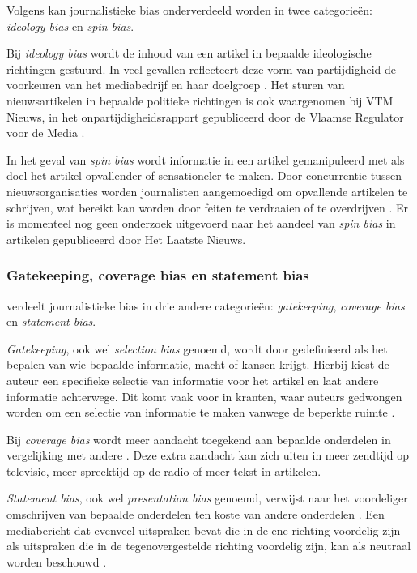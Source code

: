 Volgens \textcite{Mullainathan2002} kan journalistieke bias onderverdeeld worden in twee categorieën: \textit{ideology bias} en \textit{spin bias}. 

Bij \textit{ideology bias} wordt de inhoud van een artikel in bepaalde ideologische richtingen gestuurd. In veel gevallen reflecteert deze vorm van partijdigheid de voorkeuren van het mediabedrijf en haar doelgroep \autocite{Mullainathan2002}. Het sturen van nieuwsartikelen in bepaalde politieke richtingen is ook waargenomen bij VTM Nieuws, in het onpartijdigheidsrapport gepubliceerd door de Vlaamse Regulator voor de Media \autocite{VanAelst2024}.

In het geval van \textit{spin bias} wordt informatie in een artikel gemanipuleerd met als doel het artikel opvallender of sensationeler te maken. Door concurrentie tussen nieuwsorganisaties worden journalisten aangemoedigd om opvallende artikelen te schrijven, wat bereikt kan worden door feiten te verdraaien of te overdrijven \autocite{Alsem2008}. Er is momenteel nog geen onderzoek uitgevoerd naar het aandeel van \textit{spin bias} in artikelen gepubliceerd door Het Laatste Nieuws.

\subsubsection{Gatekeeping, coverage bias en state\-ment bias}

\textcite{SaezTrumper2013} verdeelt journalistie\-ke bias in drie andere categorieën: \textit{gatekeeping}, \textit{coverage bias} en \textit{statement bias}.

\textit{Gatekeeping}, ook wel \textit{selection bias} genoemd, wordt door \textcite{CALD2025} gedefinieerd als het bepalen van wie bepaalde informatie, macht of kansen krijgt. Hierbij kiest de auteur een specifieke selectie van informatie voor het artikel en laat andere informatie achterwege. Dit komt vaak voor in kranten, waar auteurs gedwongen worden om een selectie van informatie te maken vanwege de beperkte ruimte \autocite{SaezTrumper2013}.

Bij \textit{coverage bias} wordt meer aandacht toegekend aan bepaalde onderdelen in vergelijking met andere \autocite{DAlessio2006}. Deze extra aandacht kan zich uiten in meer zendtijd op televisie, meer spreektijd op de radio of meer tekst in artikelen.

\textit{Statement bias}, ook wel \textit{presentation bias} genoemd, verwijst naar het voordeliger omschrijven van bepaalde onderdelen ten koste van andere onderdelen \autocite{SaezTrumper2013}. Een mediabericht dat evenveel uitspraken bevat die in de ene richting voordelig zijn als uitspraken die in de tegenovergestelde richting voordelig zijn, kan als neutraal worden beschouwd \autocite{DAlessio2006}.

